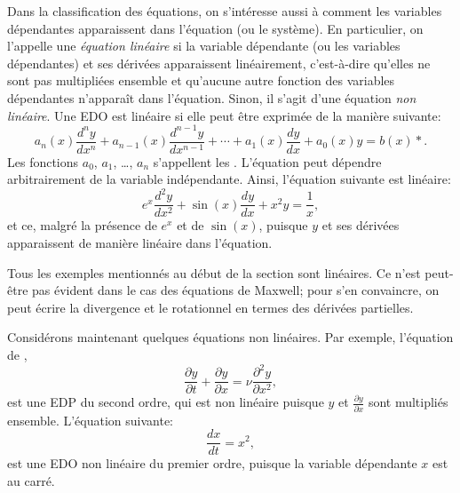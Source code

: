 Dans la classification des équations, on s'intéresse aussi à comment les variables dépendantes 
apparaissent dans l'équation (ou le système).  
En particulier, on l'appelle une \emph{équation linéaire} 
si la variable dépendante (ou les variables dépendantes) et ses dérivées apparaissent linéairement,  
c'est-à-dire qu'elles ne sont pas multipliées ensemble et qu'aucune autre fonction des variables dépendantes n'apparaît dans l'équation.  
Sinon, il s'agit d'une équation \emph{non linéaire}.  
Une EDO est linéaire si elle peut être exprimée de la manière suivante: 
\begin{equation} \label{classification:eqlingen}
a_n(x) \frac{d^n y}{dx^n} 
	+ a_{n-1}(x) \frac{d^{n-1} y}{dx^{n-1}} 
	+ \cdots
	+ a_{1}(x) \frac{dy}{dx} 
	+ a_{0}(x) y 
	= b(x) *.
\end{equation}
Les fonctions $a_0$, $a_1$, \ldots, $a_n$ s'appellent les \emph{}.
L'équation peut dépendre arbitrairement de la variable indépendante.  
Ainsi, l'équation suivante est linéaire:
\begin{equation} \label{classification:eqlinex}
	e^x \frac{d^2 y}{dx^2} + \sin(x) \frac{d y}{dx} +  x^2 y = \frac{1}{x},
\end{equation}
et ce, malgré la présence de $e^x$ et de $\sin(x)$, puisque $y$ et ses dérivées apparaissent de manière linéaire dans l'équation.

Tous les exemples mentionnés au début de la section sont linéaires.  
Ce n'est peut-être pas évident dans le cas des équations de Maxwell; 
pour s'en convaincre, on peut écrire la divergence et le rotationnel en termes des dérivées partielles. 

Considérons maintenant quelques équations non linéaires.  
Par exemple, l'équation de , 
\begin{equation*}
	\frac{\partial y}{\partial t} +  \frac{\partial y}{\partial x} 
	= \nu \frac{\partial^2 y}{\partial x^2}, 
\end{equation*}
est une EDP du second ordre, qui est non linéaire puisque $y$ et $\frac{\partial y}{\partial x}$ sont multipliés ensemble.
L'équation suivante: 
\begin{equation} \label{classification:eqnonlinode}
	\frac{dx}{dt} = x^2,
\end{equation}
est une EDO non linéaire du premier ordre, puisque la variable dépendante $x$ est au carré.

\medskip


